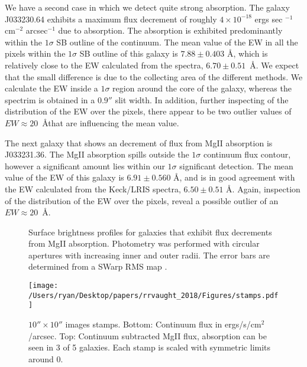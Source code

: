 \documentclass[twocolumn]{aastex6}
\begin{document}
We have a second case in which we detect quite strong absorption. The galaxy J033230.64 exhibits a maximum flux decrement of roughly $4\times10^{-18}$ ergs sec $^{-1}$ cm$^{-2}$ arcsec$^{-1}$ due to  absorption. The absorption is exhibited predominantly within the $1\sigma$ SB outline of the continuum. The mean value of the EW in all the pixels within the $1\sigma$ SB outline of this galaxy is $7.88 \pm 0.403$ \AA, which is relatively close to the EW calculated from the spectra, $6.70 \pm 0.51$\ \AA. We expect that the small difference is due to the collecting area of the different methods. We calculate the EW inside a $1\sigma$ region around the core of the galaxy, whereas the spectrim is obtained in a $0.9''$ slit width. In addition, further inspecting of the distribution of the EW over the pixels, there appear to be two outlier values of $EW\approx 20$\ \AA that are influencing the mean value.

The next galaxy that shows an decrement of flux from MgII absorption is J033231.36. The MgII absorption spills outside the $1\sigma$ continuum flux contour, however a significant amount lies within our $1\sigma$ significant detection. The mean value of the EW of this galaxy is $6.91 \pm 0.560$ \AA, and is in good agreement with the EW calculated from the Keck/LRIS spectra, $6.50 \pm 0.51$ \AA. Again, inspection of the distribution of the EW over the pixels, reveal a possible outlier of an $EW\approx 20$\ \AA.


\begin{figure*}
\centering
{}
\caption{Surface brightness profiles for galaxies that exhibit flux decrements from MgII absorption. Photometry was performed with circular apertures with increasing inner and outer radii. The error bars are determined from a SWarp RMS map .}
\label{fig:sb_profiles}
\end{figure*}

\begin{figure*}[!htb]
\centering
\texttt{[image: /Users/ryan/Desktop/papers/rrvaught\_2018/Figures/stamps.pdf]}
\caption{ $10'' \times 10''$ images stamps. Bottom: Continuum flux in ergs/s/cm$^2$/arcsec. Top: Continuum subtracted MgII flux, absorption can be seen in 3 of 5 galaxies. Each stamp is scaled with symmetric limits around 0.}
\label{fig:stamp_images}
\end{figure*}
\end{document}
